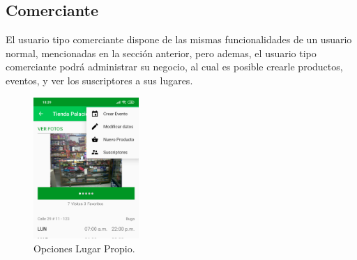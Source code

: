 \documentclass[12pt,letterpaper,openany]{book}
\begin{document}
\subsection{Comerciante}
El usuario tipo comerciante dispone de las mismas funcionalidades de un usuario normal, mencionadas en la sección anterior, pero ademas, el usuario tipo comerciante podrá administrar su negocio, al cual es posible crearle productos, eventos, y ver los suscriptores a sus lugares.\\
\begin{figure}[H]
\begin{center}
\includegraphics[width=4cm]{./imagenes/7}
\caption{Opciones Lugar Propio.}
\end{center}
\end{figure}
\end{document}
